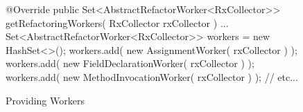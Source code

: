 \begin{figure}[H]
\begin{sourcecode}
\begin{javacode}{}
@Override
public Set<AbstractRefactorWorker<RxCollector>> getRefactoringWorkers( RxCollector rxCollector ) {
	...
	Set<AbstractRefactorWorker<RxCollector>> workers = new HashSet<>();
	workers.add( new AssignmentWorker( rxCollector ) );
	workers.add( new FieldDeclarationWorker( rxCollector ) );
	workers.add( new MethodInvocationWorker( rxCollector ) );
	// etc...
}
\end{javacode}
\caption{\toolextension{} Providing Workers}
\label{code:workers}
\end{sourcecode}
\end{figure}